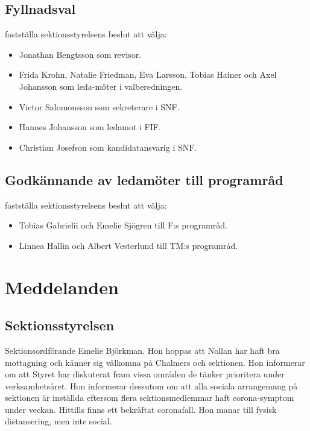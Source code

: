 \documentclass[hidelinks]{../sektionsmote} %
\begin{document}
\subsection{Fyllnadsval}
\begin{beslut}
    \item fastställa sektionsstyrelsens beslut att välja:
    \begin{itemize}
        \item Jonathan Bengtsson som revisor.
        \item Frida Krohn, Natalie Friedman, Eva Larsson, Tobias Hainer och Axel Johansson som leda-möter i valberedningen.
        \item Victor Salomonsson som sekreterare i SNF.
        \item Hannes Johansson som ledamot i FIF.
        \item Christian Josefson som kandidatansvarig i SNF.
    \end{itemize}
\end{beslut}

\subsection{Godkännande av ledamöter till programråd}
\begin{beslut}
    \item fastställa sektionsstyrelsens beslut att välja:
    \begin{itemize}
        \item Tobias Gabrielii och Emelie Sjögren till F:s programråd.
        \item Linnea Hallin och Albert Vesterlund till TM:s programråd.
    \end{itemize}
\end{beslut}


\section{Meddelanden}

\subsection{Sektionsstyrelsen}
Sektionsordförande Emelie Björkman.
Hon hoppas att Nollan har haft bra mottagning och känner sig välkomna på Chalmers och sektionen.
Hon informerar om att Styret har diskuterat fram vissa områden de tänker prioritera under verksamhetsåret.
Hon informerar dessutom om att alla sociala arrangemang på sektionen är inställda eftersom flera sektionsmedlemmar haft corona-symptom under veckan.
Hittills finns ett bekräftat coronafall.
Hon manar till fysisk distansering, men inte social.
\end{document}
